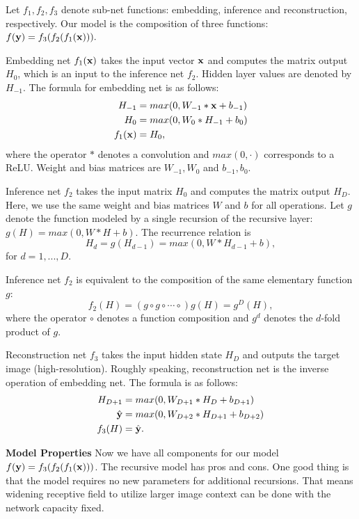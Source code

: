\documentclass[10pt,twocolumn,letterpaper]{article}
\begin{document}
 Let $f_1, f_2, f_3$ denote sub-net functions: embedding, inference and reconstruction, respectively. Our model is the composition of three functions: $f({\bf y}) = f_3(f_2 (f_1({\bf x}))).$
 
 Embedding net $f_1({\bf x})$ takes the input vector ${\bf x}$ and computes the matrix output $H_0$, which is an input to the inference net $f_2$. Hidden layer values are denoted by $H_{-1}$. The formula for embedding net is as follows:
  \begin{align}
        H_{-1} &= max(0, W_{-1}*{\bf x} + b_{-1})\\
        H_0 &= max(0, W_{0}*H_{-1} + b_0)\\
        f_1({\bf x}) &= H_0,
    \end{align}
where the operator $*$ denotes a convolution and $max(0,\cdot)$ corresponds to a ReLU. Weight and bias matrices are $W_{-1},W_0$ and $b_{-1},b_0$.

Inference net $f_2$ takes the input matrix $H_0$ and computes the matrix output $H_{D}$. Here, we use the same weight and bias matrices $W$ and $b$ for all operations.  Let $g$ denote the function modeled by a single recursion of the recursive layer: $g(H)=max(0,W*H+b)$. The recurrence relation is  
\begin{equation}
 H_d = g(H_{d-1}) = max(0,W*H_{d-1}+b),
\end{equation}
for $d = 1, ..., D$. 

Inference net $f_2$ is equivalent to the composition of the same elementary function $g$: 
\begin{equation}
f_2(H) = (g \circ g \circ \cdots \circ) g(H) =  g^{D}(H),
\end{equation}
where the operator $\circ$ denotes a function composition and $g^{d}$ denotes the $d$-fold product of $g$.

Reconstruction net $f_3$ takes the input hidden state $H_D$ and outputs the target image (high-resolution). Roughly speaking, reconstruction net is the inverse operation of embedding net. The formula is as follows:
\begin{align}
	H_{D+1} &= max(0, W_{D+1}*H_D + b_{D+1})\\
	\hat{{\bf y}} &= max(0, W_{D+2}*H_{D+1} + b_{D+2})\\
	f_3(H) &= \hat{{\bf y}}.
\end{align}

\textbf{Model Properties} Now we have all components for our model $f({\bf y}) = f_3(f_2 (f_1({\bf x})))$. The recursive model has pros and cons. One good thing is that the model requires no new parameters for additional recursions. That means widening receptive field to utilize larger image context can be done with the network capacity fixed. 
\end{document}
